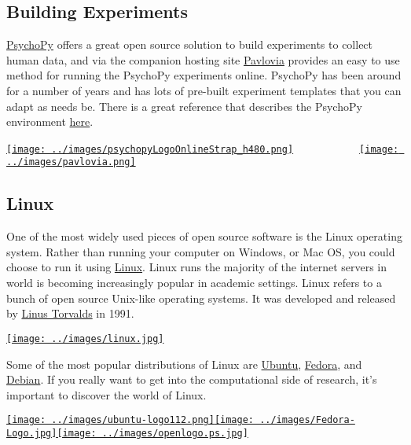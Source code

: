\documentclass[
]{book}
\begin{document}
\hypertarget{building-experiments}{%
\subsection{Building Experiments}\label{building-experiments}}

\href{https://www.psychopy.org}{PsychoPy} offers a great open source solution to build experiments to collect human data, and via the companion hosting site \href{https://pavlovia.org}{Pavlovia} provides an easy to use method for running the PsychoPy experiments online. PsychoPy has been around for a number of years and has lots of pre-built experiment templates that you can adapt as needs be. There is a great reference that describes the PsychoPy environment \href{https://link.springer.com/article/10.3758/s13428-018-01193-y}{here}.

\href{https://www.psychopy.org}{\texttt{[image: ../images/psychopyLogoOnlineStrap\_h480.png]}}~~~~~~~~~~~~\href{https://pavlovia.org}{\texttt{[image: ../images/pavlovia.png]}}

\hypertarget{linux}{%
\subsection{Linux}\label{linux}}

One of the most widely used pieces of open source software is the Linux operating system. Rather than running your computer on Windows, or Mac OS, you could choose to run it using \href{https://www.linux.org}{Linux}. Linux runs the majority of the internet servers in world is becoming increasingly popular in academic settings. Linux refers to a bunch of open source Unix-like operating systems. It was developed and released by \href{https://en.wikipedia.org/wiki/Linus_Torvalds}{Linus Torvalds} in 1991.

\href{https://www.linux.org}{\texttt{[image: ../images/linux.jpg]}}

Some of the most popular distributions of Linux are \href{https://ubuntu.com}{Ubuntu}, \href{https://getfedora.org/en/workstation/download/}{Fedora}, and \href{https://www.debian.org}{Debian}. If you really want to get into the computational side of research, it's important to discover the world of Linux.

\href{https://ubuntu.com}{\texttt{[image: ../images/ubuntu-logo112.png]}}\href{(https://getfedora.org/en/workstation/download/)}{\texttt{[image: ../images/Fedora-Logo.jpg]}}\href{https://www.debian.org}{\texttt{[image: ../images/openlogo.ps.jpg]}}
\end{document}
